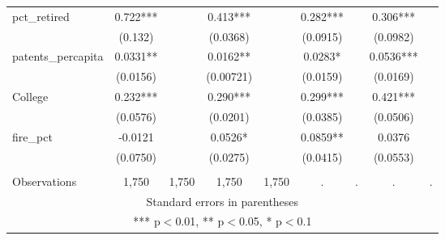 \begin{tabular}{lcccccccc}
pct\_retired & 0.722*** &  & 0.413*** &  & 0.282*** &  & 0.306*** &  \\
 & (0.132) &  & (0.0368) &  & (0.0915) &  & (0.0982) &  \\
patents\_percapita & 0.0331** &  & 0.0162** &  & 0.0283* &  & 0.0536*** &  \\
 & (0.0156) &  & (0.00721) &  & (0.0159) &  & (0.0169) &  \\
College & 0.232*** &  & 0.290*** &  & 0.299*** &  & 0.421*** &  \\
 & (0.0576) &  & (0.0201) &  & (0.0385) &  & (0.0506) &  \\
fire\_pct & -0.0121 &  & 0.0526* &  & 0.0859** &  & 0.0376 &  \\
 & (0.0750) &  & (0.0275) &  & (0.0415) &  & (0.0553) &  \\
 &  &  &  &  &  &  &  &  \\
 Observations & 1,750 & 1,750 & 1,750 & 1,750 & . & . & . & . \\ \hline
\multicolumn{9}{c}{ Standard errors in parentheses} \\
\multicolumn{9}{c}{ *** p$<$0.01, ** p$<$0.05, * p$<$0.1} \\
\end{tabular}
